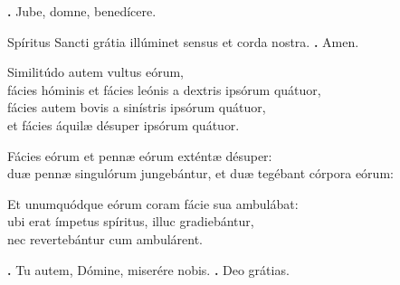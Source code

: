 \begin{small}
\textbf{\Vbar.} Jube, domne, benedícere.

Spíritus Sancti grátia illúminet sensus et corda nostra. 
\textbf{\Rbar.} Amen.
\end{small}


Similitúdo autem vultus eórum, \\
fácies hóminis et fácies leónis a dextris ipsórum quátuor, \\
fácies autem bovis a sinístris ipsórum quátuor, \\
et fácies áquilæ désuper ipsórum quátuor.

Fácies eórum et pennæ eórum exténtæ désuper: \\
duæ pennæ singulórum jungebántur, et duæ tegébant córpora eórum:

Et unumquódque eórum coram fácie sua ambulábat: \\
ubi erat ímpetus spíritus, illuc gradiebántur, \\
nec revertebántur cum ambulárent.

\textbf{\Vbar.} Tu autem, Dómine, miserére nobis.
\textbf{\Rbar.} Deo grátias.

